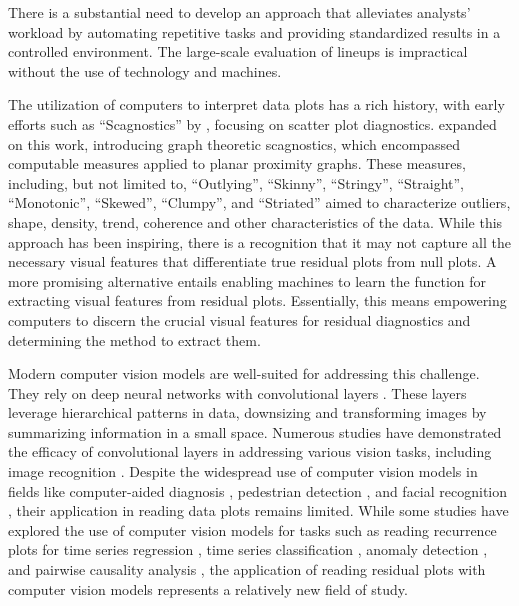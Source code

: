 \documentclass[]{interact}
\theoremstyle{plain}%
\theoremstyle{definition}
\theoremstyle{remark}
\begin{document}
There is a substantial need to develop an approach that alleviates
analysts' workload by automating repetitive tasks and providing
standardized results in a controlled environment. The large-scale
evaluation of lineups is impractical without the use of technology and
machines.

The utilization of computers to interpret data plots has a rich history,
with early efforts such as ``Scagnostics'' by \citet{tukey1985computer},
focusing on scatter plot diagnostics. \citet{wilkinson2005graph}
expanded on this work, introducing graph theoretic scagnostics, which
encompassed computable measures applied to planar proximity graphs.
These measures, including, but not limited to, ``Outlying'', ``Skinny'',
``Stringy'', ``Straight'', ``Monotonic'', ``Skewed'', ``Clumpy'', and
``Striated'' aimed to characterize outliers, shape, density, trend,
coherence and other characteristics of the data. While this approach has
been inspiring, there is a recognition \citep{buja2009statistical} that
it may not capture all the necessary visual features that differentiate
true residual plots from null plots. A more promising alternative
entails enabling machines to learn the function for extracting visual
features from residual plots. Essentially, this means empowering
computers to discern the crucial visual features for residual
diagnostics and determining the method to extract them.

Modern computer vision models are well-suited for addressing this
challenge. They rely on deep neural networks with convolutional layers
\citep{fukushima1982neocognitron}. These layers leverage hierarchical
patterns in data, downsizing and transforming images by summarizing
information in a small space. Numerous studies have demonstrated the
efficacy of convolutional layers in addressing various vision tasks,
including image recognition \citep{rawat2017deep}. Despite the
widespread use of computer vision models in fields like computer-aided
diagnosis \citep{lee2015image}, pedestrian detection
\citep{brunetti2018computer}, and facial recognition
\citep{emami2012facial}, their application in reading data plots remains
limited. While some studies have explored the use of computer vision
models for tasks such as reading recurrence plots for time series
regression \citep{ojeda2020multivariate}, time series classification
\citep{chu2019automatic, hailesilassie2019financial, hatami2018classification, zhang2020encoding},
anomaly detection \citep{chen2020convolutional}, and pairwise causality
analysis \citep{singh2017deep}, the application of reading residual
plots with computer vision models represents a relatively new field of
study.
\end{document}
